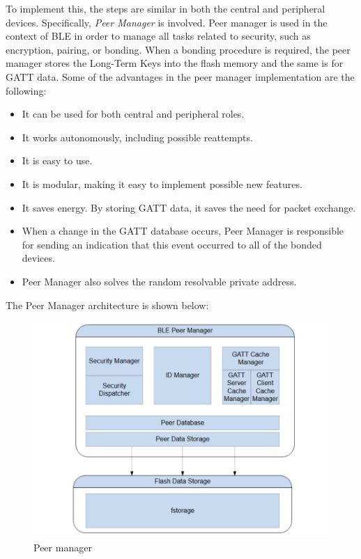 \documentclass{Configuration_Files/PoliMi3i_thesis}
\begin{document}
To implement this, the steps are similar in both the central and peripheral devices. Specifically, \textit{Peer Manager} is involved. Peer manager is used in the context of BLE in order to manage all tasks related to security, such as encryption, pairing, or bonding. When a bonding procedure is required, the peer manager stores the Long-Term Keys into the flash memory and the same is for GATT data. Some of the advantages in the peer manager implementation are the following:

\begin{itemize}
    \item It can be used for both central and peripheral roles.
    \item It works autonomously, including possible reattempts.
    \item It is easy to use.
    \item It is modular, making it easy to implement possible new features.
    \item It saves energy. By storing GATT data, it saves the need for packet exchange.
    \item When a change in the GATT database occurs, Peer Manager is responsible for sending an indication that this event occurred to all of the bonded devices.
    \item Peer Manager also solves the random resolvable private address.
\end{itemize}

The Peer Manager architecture is shown below:

\begin{figure}[h]
    \centering
    \includegraphics[scale=0.3]{Firmware_security/Screenshot 2024-07-22 at 22.33.12.png}
    \caption{Peer manager}
    \label{firm_sec_1}
\end{figure}
\end{document}
